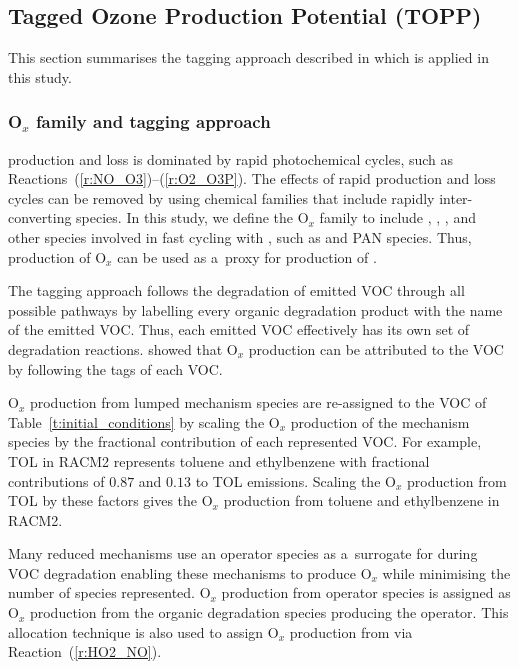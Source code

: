 \documentclass[acpd, online, hvmath]{copernicus}
\begin{document}
\subsection{Tagged Ozone Production Potential (TOPP)}

This section summarises the tagging approach described in \citet{Butler:2011} which is applied in this study.

\subsubsection{O$_{x}$ family and tagging approach}
\label{ss:tagging}

 production and loss is dominated by rapid photochemical
cycles, such as Reactions~(\ref{r:NO_O3})--(\ref{r:O2_O3P}).  The
effects of rapid production and loss cycles can be removed by using
chemical families that include rapidly inter-converting species.  In
this study, we define the O$_{x}$ family to include ,
, ,  and other species involved
in fast cycling with , such as  and PAN
species.  Thus, production of O$_{x}$ can be used as a~proxy for
production of .

The tagging approach follows the degradation of emitted VOC through
all possible pathways by labelling every organic degradation product
with the name of the emitted VOC.  Thus, each emitted VOC effectively
has its own set of degradation reactions.  \citet{Butler:2011} showed
that O$_{x}$ production can be attributed to the VOC by following
the tags of each VOC.

O$_{x}$ production from lumped mechanism species are re-assigned to
the VOC of Table~\ref{t:initial_conditions} by scaling the O$_{x}$
production of the mechanism species by the fractional contribution of
each represented VOC.  For example, TOL in RACM2 represents toluene
and ethylbenzene with fractional contributions of $0.87$ and $0.13$ to
TOL emissions.  Scaling the O$_{x}$ production from TOL by these
factors gives the O$_{x}$ production from toluene and ethylbenzene
in RACM2.

Many reduced mechanisms use an operator species as a~surrogate for
 during VOC degradation enabling these mechanisms to
produce O$_{x}$ while minimising the number of  species
represented.  O$_{x}$ production from operator species is assigned
as O$_{x}$ production from the organic degradation species
producing the operator.  This allocation technique is also used to
assign O$_{x}$ production from  via
Reaction~(\ref{r:HO2_NO}).
\end{document}
